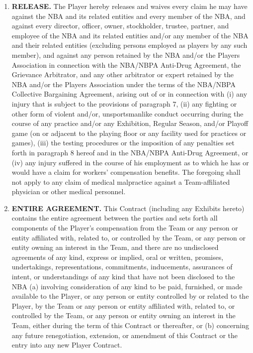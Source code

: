 \documentclass[
]{book}
\begin{document}
\begin{enumerate}
\item
  \textbf{RELEASE.} The Player hereby releases and waives every claim he may have against the NBA and its related entities and every member of the NBA, and against every director, officer, owner, stockholder, trustee, partner, and employee of the NBA and its related entities and/or any member of the NBA and their related entities (excluding persons employed as players by any such member), and against any person retained by the NBA and/or the Players Association in connection with the NBA/NBPA Anti-Drug Agreement, the Grievance Arbitrator, and any other arbitrator or expert retained by the NBA and/or the Players Association under the terms of the NBA/NBPA Collective Bargaining Agreement, arising out of or in connection with (i) any injury that is subject to the provisions of paragraph 7, (ii) any fighting or other form of violent and/or, unsportsmanlike conduct occurring during the course of any practice and/or any Exhibition, Regular Season, and/or Playoff game (on or adjacent to the playing floor or any facility used for practices or games), (iii) the testing procedures or the imposition of any penalties set forth in paragraph 8 hereof and in the NBA/NBPA Anti-Drug Agreement, or (iv) any injury suffered in the course of his employment as to which he has or would have a claim for workers' compensation benefits. The foregoing shall not apply to any claim of medical malpractice against a Team-affiliated physician or other medical personnel.
\item
  \textbf{ENTIRE AGREEMENT.} This Contract (including any Exhibits hereto) contains the entire agreement between the parties and sets forth all components of the Player's compensation from the Team or any person or entity affiliated with, related to, or controlled by the Team, or any person or entity owning an interest in the Team, and there are no undisclosed agreements of any kind, express or implied, oral or written, promises, undertakings, representations, commitments, inducements, assurances of intent, or understandings of any kind that have not been disclosed to the NBA (a) involving consideration of any kind to be paid, furnished, or made available to the Player, or any person or entity controlled by or related to the Player, by the Team or any person or entity affiliated with, related to, or controlled by the Team, or any person or entity owning an interest in the Team, either during the term of this Contract or thereafter, or (b) concerning any future renegotiation, extension, or amendment of this Contract or the entry into any new Player Contract.
\end{enumerate}
\end{document}
